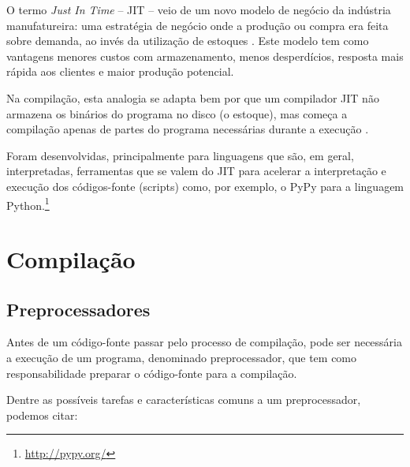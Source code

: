O termo \textit{Just In Time} -- JIT -- veio de um novo modelo de  negócio da
 indústria manufatureira: uma estratégia de negócio onde a produção 
ou compra era feita sobre demanda, ao invés da utilização de estoques
 \cite[pág. 177]{ref10}. 
Este modelo tem como vantagens menores custos com armazenamento, 
menos desperdícios, resposta mais rápida aos clientes e maior 
produção potencial.

Na compilação, esta analogia se adapta bem por que um compilador JIT 
não armazena os binários do programa no disco (o estoque), mas começa 
a compilação apenas de partes do programa necessárias durante a execução
 \cite[pág. 8]{ref2}.

Foram desenvolvidas, principalmente para linguagens que são, em geral, 
interpretadas, ferramentas que se valem do JIT para acelerar a interpretação
 e execução dos códigos-fonte (scripts) como, 
por exemplo, o PyPy para a linguagem Python.\footnote{\url{http://pypy.org/}}


\section{Compilação}

\subsection{Preprocessadores}


Antes de um código-fonte passar pelo processo de compilação, pode ser
 necessária a execução de um programa, denominado preprocessador, que
 tem como responsabilidade preparar o código-fonte para a compilação. 

Dentre as possíveis tarefas e características comuns a um preprocessador,
 podemos citar:

